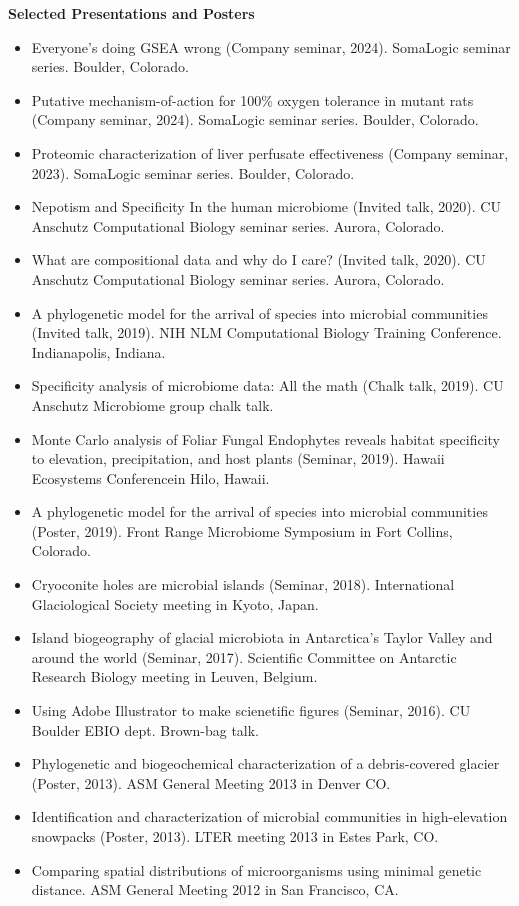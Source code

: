 \documentclass{article}
\begin{document}
{\large  \textbf{Selected Presentations and Posters}}
\begin{itemize}[noitemsep,topsep=0pt, leftmargin=5mm]
  \item Everyone's doing GSEA wrong (Company seminar, 2024). SomaLogic seminar series. Boulder, Colorado.
  \item Putative mechanism-of-action for 100\% oxygen tolerance in mutant rats (Company seminar, 2024). SomaLogic seminar series. Boulder, Colorado.
  \item Proteomic characterization of liver perfusate effectiveness (Company seminar, 2023). SomaLogic seminar series. Boulder, Colorado.
  \item Nepotism and Specificity In the human microbiome (Invited talk, 2020). CU Anschutz Computational Biology seminar series. Aurora, Colorado.
  \item What are compositional data and why do I care? (Invited talk, 2020). CU Anschutz Computational Biology seminar series. Aurora, Colorado.
  \item A phylogenetic model for the arrival of species into microbial communities (Invited talk, 2019). NIH NLM Computational Biology Training Conference. Indianapolis, Indiana.
  \item Specificity analysis of microbiome data: All the math (Chalk talk, 2019). CU Anschutz Microbiome group chalk talk.
  \item Monte Carlo analysis of Foliar Fungal Endophytes reveals habitat specificity to elevation, precipitation, and host plants (Seminar, 2019). Hawaii Ecosystems Conferencein  Hilo, Hawaii.
  \item A phylogenetic model for the arrival of species into microbial communities (Poster, 2019). Front Range Microbiome Symposium in Fort Collins, Colorado.
  \item Cryoconite holes are microbial islands (Seminar, 2018). International Glaciological Society meeting in Kyoto, Japan.
  \item Island biogeography of glacial microbiota in Antarctica’s Taylor Valley and around the world (Seminar, 2017). Scientific Committee on Antarctic Research Biology meeting in Leuven, Belgium.
  \item Using Adobe Illustrator to make scienetific figures (Seminar, 2016). CU Boulder EBIO dept. Brown-bag talk.
  \item Phylogenetic and biogeochemical characterization of a debris-covered glacier (Poster, 2013). ASM General Meeting 2013 in Denver CO.
  \item Identification and characterization of microbial communities in high-elevation snowpacks (Poster, 2013). LTER meeting 2013 in Estes Park, CO.
  \item Comparing spatial distributions of microorganisms using minimal genetic distance. ASM General Meeting 2012 in San Francisco, CA.
\end{itemize}
\vspace{3mm}
\end{document}
